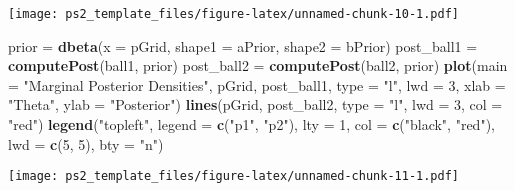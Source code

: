 \documentclass[
]{article}
\newenvironment{Shaded}{\begin{snugshade}}{\end{snugshade}}
\newcommand{\AttributeTok}[1]{\textcolor[rgb]{0.13,0.29,0.53}{#1}}
\newcommand{\DecValTok}[1]{\textcolor[rgb]{0.00,0.00,0.81}{#1}}
\newcommand{\FunctionTok}[1]{\textcolor[rgb]{0.13,0.29,0.53}{\textbf{#1}}}
\newcommand{\NormalTok}[1]{#1}
\newcommand{\OtherTok}[1]{\textcolor[rgb]{0.56,0.35,0.01}{#1}}
\newcommand{\StringTok}[1]{\textcolor[rgb]{0.31,0.60,0.02}{#1}}
\begin{document}
\texttt{[image: ps2\_template\_files/figure-latex/unnamed-chunk-10-1.pdf]}

\begin{Shaded}
\begin{Highlighting}[]
\NormalTok{prior }\OtherTok{=} \FunctionTok{dbeta}\NormalTok{(}\AttributeTok{x =}\NormalTok{ pGrid, }\AttributeTok{shape1 =}\NormalTok{ aPrior, }\AttributeTok{shape2 =}\NormalTok{ bPrior)}
\NormalTok{post\_ball1 }\OtherTok{=} \FunctionTok{computePost}\NormalTok{(ball1, prior)}
\NormalTok{post\_ball2 }\OtherTok{=} \FunctionTok{computePost}\NormalTok{(ball2, prior)}
\FunctionTok{plot}\NormalTok{(}\AttributeTok{main =} \StringTok{"Marginal Posterior Densities"}\NormalTok{, pGrid, post\_ball1, }
     \AttributeTok{type =} \StringTok{"l"}\NormalTok{, }\AttributeTok{lwd =} \DecValTok{3}\NormalTok{, }\AttributeTok{xlab =} \StringTok{"Theta"}\NormalTok{, }\AttributeTok{ylab =} \StringTok{"Posterior"}\NormalTok{)}
\FunctionTok{lines}\NormalTok{(pGrid, post\_ball2, }\AttributeTok{type =} \StringTok{"l"}\NormalTok{, }\AttributeTok{lwd =} \DecValTok{3}\NormalTok{, }\AttributeTok{col =} \StringTok{"red"}\NormalTok{)}
\FunctionTok{legend}\NormalTok{(}\StringTok{"topleft"}\NormalTok{, }\AttributeTok{legend =} \FunctionTok{c}\NormalTok{(}\StringTok{"p1"}\NormalTok{, }\StringTok{"p2"}\NormalTok{), }\AttributeTok{lty =} \DecValTok{1}\NormalTok{, }
       \AttributeTok{col =} \FunctionTok{c}\NormalTok{(}\StringTok{"black"}\NormalTok{, }\StringTok{"red"}\NormalTok{), }\AttributeTok{lwd =} \FunctionTok{c}\NormalTok{(}\DecValTok{5}\NormalTok{, }\DecValTok{5}\NormalTok{), }\AttributeTok{bty =} \StringTok{"n"}\NormalTok{)}
\end{Highlighting}
\end{Shaded}

\texttt{[image: ps2\_template\_files/figure-latex/unnamed-chunk-11-1.pdf]}
\end{document}
